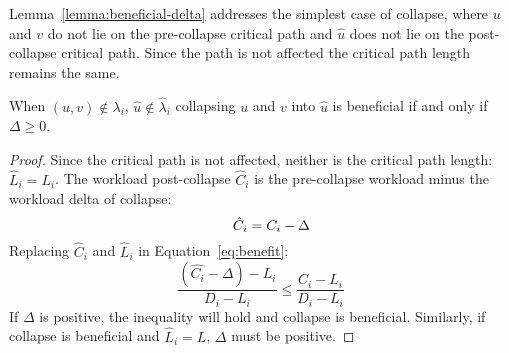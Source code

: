 Lemma~\ref{lemma:beneficial-delta} addresses the simplest case of
collapse, where ${u}$ and ${v}$ do not lie on the pre-collapse
critical path and ${\hat{u}}$ does not lie on the post-collapse
critical path. Since the path is not affected the critical path
length remains the same.

\begin{lemma}\label{lemma:beneficial-delta}
  When ${(u, v) \not \in \lambda_i}$, ${\hat{u} \not \in \hat{\lambda}_i}$
  collapsing ${u}$ and ${v}$ into ${\hat{u}}$ is beneficial if and
  only if ${\Delta \ge 0}$.

  \begin{proof}
    Since the critical path is not affected, neither is the critical
    path length: ${\hat{L}_i = L_i}$. The workload post-collapse
    ${\hat{C}_i}$ is the pre-collapse workload minus the workload
    delta of collapse:
    \begin{equation*}
      \indent
      \hat{C}_i = C_i - \Delta
    \end{equation*}
    Replacing ${\hat{C}_i}$ and ${\hat{L}_i}$ in Equation~\ref{eq:benefit}:
    \begin{equation*}
    \frac{(\hat{C_i} - \Delta) - L_i}
           {D_i - L_i} \le
      \frac{C_i - L_i}
           {D_i - L_i}
    \end{equation*}
    If ${\Delta}$ is positive, the inequality will hold and collapse
    is beneficial. Similarly, if collapse is beneficial and
    ${\hat{L}_i = L}$, ${\Delta}$ must be positive.
  \end{proof}
\end{lemma}

